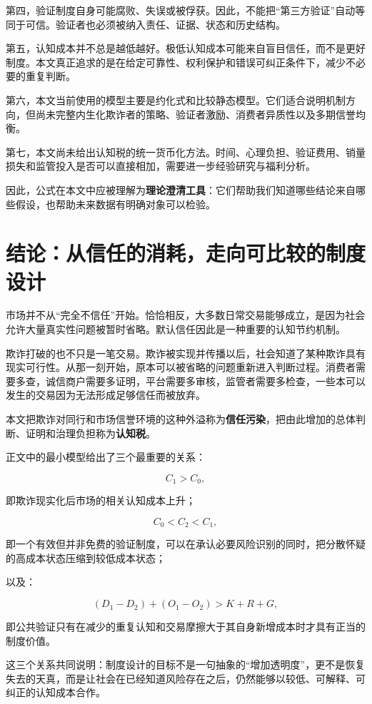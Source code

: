 \documentclass[UTF8,12pt]{ctexart}
\begin{document}
第四，验证制度自身可能腐败、失误或被俘获。因此，不能把“第三方验证”自动等同于可信。验证者也必须被纳入责任、证据、状态和历史结构。

第五，认知成本并不总是越低越好。极低认知成本可能来自盲目信任，而不是更好制度。本文真正追求的是在给定可靠性、权利保护和错误可纠正条件下，减少不必要的重复判断。

第六，本文当前使用的模型主要是约化式和比较静态模型。它们适合说明机制方向，但尚未完整内生化欺诈者的策略、验证者激励、消费者异质性以及多期信誉均衡。

第七，本文尚未给出认知税的统一货币化方法。时间、心理负担、验证费用、销量损失和监管投入是否可以直接相加，需要进一步经验研究与福利分析。

因此，公式在本文中应被理解为\textbf{理论澄清工具}：它们帮助我们知道哪些结论来自哪些假设，也帮助未来数据有明确对象可以检验。

\section{结论：从信任的消耗，走向可比较的制度设计}

市场并不从“完全不信任”开始。恰恰相反，大多数日常交易能够成立，是因为社会允许大量真实性问题被暂时省略。默认信任因此是一种重要的认知节约机制。

欺诈打破的也不只是一笔交易。欺诈被实现并传播以后，社会知道了某种欺诈具有现实可行性。从那一刻开始，原本可以被省略的问题重新进入判断过程。消费者需要多查，诚信商户需要多证明，平台需要多审核，监管者需要多检查，一些本可以发生的交易因为无法形成足够信任而被放弃。

本文把欺诈对同行和市场信誉环境的这种外溢称为\textbf{信任污染}，把由此增加的总体判断、证明和治理负担称为\textbf{认知税}。

正文中的最小模型给出了三个最重要的关系：

\[
C_1>C_0,
\]

即欺诈现实化后市场的相关认知成本上升；

\[
C_0<C_2<C_1,
\]

即一个有效但并非免费的验证制度，可以在承认必要风险识别的同时，把分散怀疑的高成本状态压缩到较低成本状态；

以及：

\[
(D_1-D_2)+(O_1-O_2)>K+R+G,
\]

即公共验证只有在减少的重复认知和交易摩擦大于其自身新增成本时才具有正当的制度价值。

这三个关系共同说明：制度设计的目标不是一句抽象的“增加透明度”，更不是恢复失去的天真，而是让社会在已经知道风险存在之后，仍然能够以较低、可解释、可纠正的认知成本合作。
\end{document}
